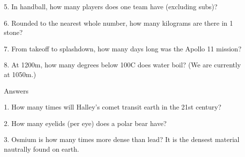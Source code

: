 \begin{frame}
\begin{center}
\Large
5. In handball, how many players does one team have (excluding subs)?
\end{center}
\end{frame}
\begin{frame}
\begin{center}
\Large
6. Rounded to the nearest whole number, how many kilograms are there in 1 stone?
\end{center}
\end{frame}
\begin{frame}
\begin{center}
\Large
7. From takeoff to splashdown, how many days long was the Apollo 11 mission?
\end{center}
\end{frame}
\begin{frame}
\begin{center}
\Large
8. At 1200m, how many degrees below 100\textdegree C does water boil? (We are currently at 1050m.)
\end{center}
\end{frame}
\begin{frame}
\begin{center}
\Huge
Answers
\end{center}
\end{frame}
\begin{frame}
\begin{center}
\Large
1. How many times will Halley's comet transit earth in the 21st century?
\\
\end{center}
\end{frame}
\begin{frame}
\begin{center}
\Large
2. How many eyelids (per eye) does a polar bear have?
\\
\end{center}
\end{frame}
\begin{frame}
\begin{center}
\Large
3. Osmium is how many times more dense than lead? It is the densest material nautrally found on earth.
\\
\end{center}
\end{frame}
